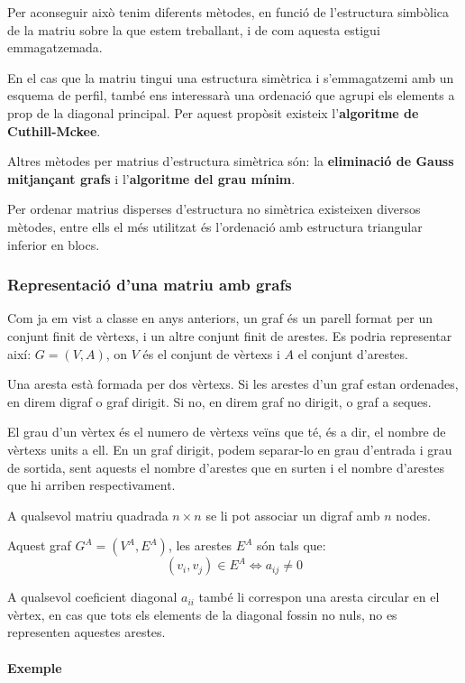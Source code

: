 \documentclass[11pt,a4paper,twoside]{report}
\begin{document}
Per aconseguir això tenim diferents mètodes, en funció de l'estructura simbòlica de la matriu sobre la que estem treballant, i de com aquesta estigui emmagatzemada.
 
En el cas que la matriu tingui una estructura simètrica i s'emmagatzemi amb un esquema de perfil, també ens interessarà una ordenació que agrupi els elements a prop de la diagonal principal. Per aquest propòsit existeix l'\textbf{algoritme de Cuthill-Mckee}.

Altres mètodes per matrius d'estructura simètrica són: la \textbf{eliminació de Gauss mitjançant grafs} i l'\textbf{algoritme del grau mínim}.


Per ordenar matrius disperses d'estructura no simètrica existeixen diversos mètodes, entre ells el més utilitzat és l'ordenació amb estructura triangular inferior en blocs.

\subsubsection{Representació d'una matriu amb grafs}

Com ja em vist a classe en anys anteriors, un graf és un parell format per un conjunt finit de vèrtexs, i un altre conjunt finit de arestes. Es podria representar així: $G = (V,A)$, on $V$ és el conjunt de vèrtexs i $A$ el conjunt d'arestes.

Una aresta està formada per dos vèrtexs. Si les arestes d'un graf estan ordenades, en direm digraf o graf dirigit. Si no, en direm graf no dirigit, o graf a seques.

El grau d'un vèrtex és el numero de vèrtexs veïns que té, és a dir, el nombre de vèrtexs units a ell. En un graf dirigit, podem separar-lo en grau d'entrada i grau de sortida, sent aquests el nombre d'arestes que en surten i el nombre d'arestes que hi arriben respectivament.


A qualsevol matriu quadrada $n \times n$ se li pot associar un digraf amb $n$ nodes.

Aquest graf $G^A = (V^A, E^A)$, les arestes $E^A$ són tals que:
\[(v_i,v_j) \in E^A \Leftrightarrow	a_{ij} \neq 0\]

A qualsevol coeficient diagonal $a_{ii}$ també li correspon una aresta circular en el vèrtex, en cas que tots els elements de la diagonal fossin no nuls, no es representen aquestes arestes.


\paragraph*{Exemple}
\end{document}
